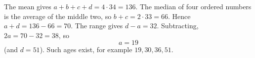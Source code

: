 The mean gives $a+b+c+d=4\cdot34=136$. The median of four ordered numbers is the average of the middle two, so $b+c=2\cdot33=66$. Hence $a+d=136-66=70$. The range gives $d-a=32$. Subtracting, $2a=70-32=38$, so
\[
a=\boxed{19}
\]
(and $d=51$). Such ages exist, for example $19,30,36,51$.
